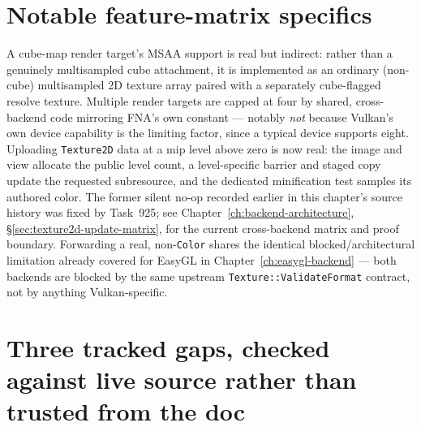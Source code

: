 \section{Notable feature-matrix specifics}

A cube-map render target's MSAA support is real but indirect: rather than a genuinely
multisampled cube attachment, it is implemented as an ordinary (non-cube) multisampled 2D
texture array paired with a separately cube-flagged resolve texture. Multiple render targets
are capped at four by shared, cross-backend code mirroring FNA's own
 constant --- notably \emph{not} because Vulkan's own
device capability is the limiting factor, since a typical device supports eight. Uploading
\texttt{Texture2D} data at a mip level above zero is now real: the image and view allocate
the public level count, a level-specific barrier and staged copy update the requested
subresource, and the dedicated minification test samples its authored color. The former
silent no-op recorded earlier in this chapter's source history was fixed by Task~925; see
Chapter~\ref{ch:backend-architecture}, \S\ref{sec:texture2d-update-matrix}, for the current
cross-backend matrix and proof boundary. Forwarding a real, non-\texttt{Color}
 shares the identical blocked/architectural
limitation already covered for EasyGL in Chapter~\ref{ch:easygl-backend} --- both backends
are blocked by the same upstream \texttt{Texture::ValidateFormat} contract, not by anything
Vulkan-specific.

\section{Three tracked gaps, checked against live source rather than trusted from the doc}

